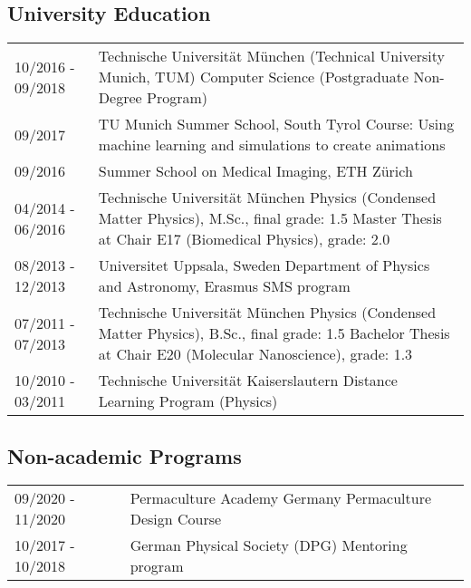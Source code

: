 \documentclass[a4paper,10pt]{memoir}
\begin{document}
\subsection*{University Education}
\vspace*{-\baselineskip}
\begin{longtable}{@{}p{} p{}}
  10/2016 - 09/2018 &
  Technische Universität München (Technical University Munich, TUM) \newline
  Computer Science (Postgraduate Non-Degree Program)
  \\
  09/2017 &
  TU Munich Summer School, South Tyrol \newline
  Course: Using machine learning and simulations to create animations
  \\
  09/2016 &
  Summer School on Medical Imaging, ETH Zürich
  \\
  04/2014 - 06/2016 &
  Technische Universität München \newline
  Physics (Condensed Matter Physics), M.Sc., final grade: 1.5 \newline
  Master Thesis at Chair E17 (Biomedical Physics), grade: 2.0
  \\
  08/2013 - 12/2013 &
  Universitet Uppsala, Sweden \newline
  Department of Physics and Astronomy, Erasmus SMS program
  \\
  07/2011 - 07/2013 &
  Technische Universität München \newline
  Physics (Condensed Matter Physics), B.Sc., final grade: 1.5 \newline
  Bachelor Thesis at Chair E20 (Molecular Nanoscience), grade: 1.3
  \\
  10/2010 - 03/2011 &
  Technische Universität Kaiserslautern \newline
  Distance Learning Program (Physics)
\end{longtable}

\subsection*{Non-academic Programs}
\vspace*{-\baselineskip}
\begin{longtable}{@{}p{} p{}}
  09/2020 - 11/2020 &
  Permaculture Academy Germany \newline
  Permaculture Design Course
  \\
  10/2017 - 10/2018 &
  German Physical Society (DPG) \newline
  Mentoring program
\end{longtable}
\end{document}
